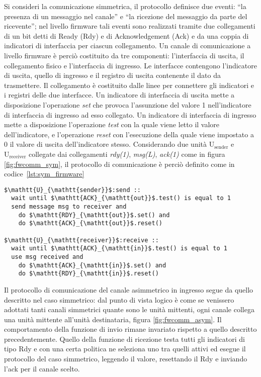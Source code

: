 Si consideri la comunicazione simmetrica, il protocollo definisce due eventi: ``la presenza di un messaggio nel canale'' e ``la ricezione del messaggio da parte del ricevente''; nel livello firmware tali eventi sono realizzati tramite due collegamenti di un bit detti di Ready (Rdy) e di Acknowledgement (Ack) e da una coppia di indicatori di interfaccia per ciascun collegamento. Un canale di comunicazione a livello firmware \`e perci\`o costituito da tre componenti: l'interfaccia di uscita, il collegamento fisico e l'interfaccia di ingresso. Le interfacce contengono l'indicatore di uscita, quello di ingresso e il registro di uscita contenente il dato da trasmettere. Il collegamento \`e costituito dalle linee per connettere gli indicatori e i registri delle due interfacce. Un indicatore di interfaccia di uscita mette a disposizione l'operazione \emph{set} che provoca l'assunzione del valore 1 nell'indicatore di interfaccia di ingresso ad esso collegato. Un indicatore di interfaccia di ingresso mette a disposizione l'operazione \emph{test} con la quale viene letto il valore dell'indicatore, e l'operazione \emph{reset} con l'esecuzione della quale viene impostato a 0 il valore di uscita dell'indicatore stesso. Considerando due unit\`a $\mathrm{U}_{\mathrm{sender}}$ e $\mathrm{U}_{\mathrm{receiver}}$ collegate dai collegamenti \emph{rdy(1)}, \emph{msg(L)}, \emph{ack(1)} come in figura \ref{fig:fwcomm_sym}, il protocollo di comunicazione \`e perci\`o definito come in codice~\ref{lst:sym_firmware}
\begin{lstlisting}[language={}, morekeywords={msg, vtg}, float=t, caption={Descrizione astratta del protocollo di comunicazione del canale firmware simmetrico}, label={lst:sym_firmware}]
$\mathtt{U}_{\mathtt{sender}}$:send ::
  wait until $\mathtt{ACK}_{\mathtt{out}}$.test() is equal to 1
  send message msg to receiver and
    do $\mathtt{RDY}_{\mathtt{out}}$.set() and 
    do $\mathtt{ACK}_{\mathtt{out}}$.reset()

$\mathtt{U}_{\mathtt{receiver}}$:receive ::
  wait until $\mathtt{ACK}_{\mathtt{in}}$.test() is equal to 1
  use msg received and 
    do $\mathtt{ACK}_{\mathtt{in}}$.set() and
    do $\mathtt{RDY}_{\mathtt{in}}$.reset()
\end{lstlisting}

Il protocollo di comunicazione del canale asimmetrico in ingresso segue da quello descritto nel caso simmetrico: dal punto di vista logico \`e come se venissero adottati tanti canali simmetrici quante sono le unit\`a mittenti, ogni canale collega una unit\`a mittente all'unit\`a destinataria, figura \ref{fig:fwcomm_asym}. Il comportamento della funzione di invio rimane invariato rispetto a quello descritto precedentemente. Quello della funzione di ricezione testa tutti gli indicatori di tipo Rdy e con una certa politica ne seleziona uno tra quelli attivi ed esegue il protocollo del caso simmetrico, leggendo il valore, resettando il Rdy e inviando l'ack per il canale scelto.

